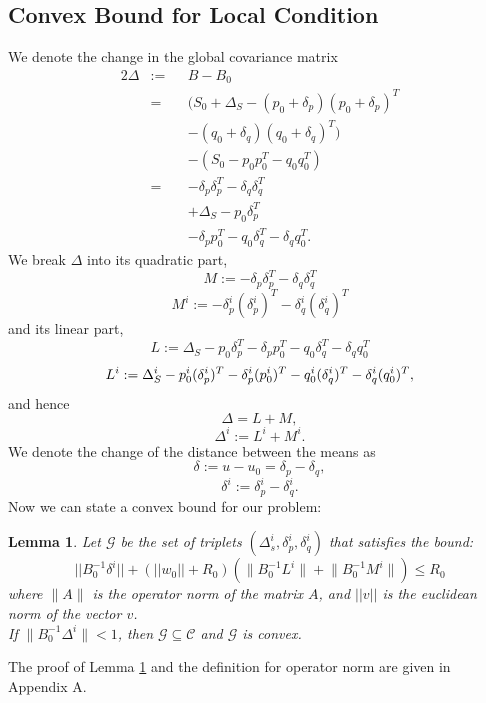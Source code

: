\documentclass{vldb}
\newtheorem{lemma}{Lemma}
\begin{document}
\subsection{Convex Bound for Local Condition}
We denote the change in the global covariance matrix
\begin{alignat*}{2}
\Delta & := && B-B_0 \\
& = && (S_0+\Delta_S - (p_0+\delta_p)(p_0+\delta_p)^T \\
& && - (q_0+\delta_q)(q_0+\delta_q)^T) \\
& && - (S_0 - p_0p_0^T - q_0q_0^T) \\
& = && - \delta_p\delta_p^T - \delta_q\delta_q^T \\
& && + \Delta_S - p_0\delta_p^T \\
& && - \delta_pp_0^T - q_0\delta_q^T - \delta_qq_0^T.
\end{alignat*}
We break $\Delta$ into its quadratic part,
\begin{equation*}
M:= - \delta_p\delta_p^T - \delta_q\delta_q^T
\end{equation*}
\begin{equation*}
M^i:= - \delta_p^i(\delta_p^i)^T - \delta_q^i(\delta_q^i)^T
\end{equation*}
and its linear part,
\begin{equation*}
L:= \Delta_S - p_0\delta_p^T - \delta_pp_0^T - q_0\delta_q^T - \delta_qq_0^T
\end{equation*}
\begin{equation*}
\\ L^i := \Delta_S^i - p_0^i(\delta_p^i)^T - \delta_p^i(p_0^i)^T -
q_0^i(\delta_q^i)^T - \delta_q^i(q_0^i)^T,
\end{equation*}
and hence
\begin{equation*}
\Delta= L+ M, 
\end{equation*}
\begin{equation*}
\Delta^i:= L^i+ M^i.
\end{equation*}
We denote the change of the distance between the means as
\begin{equation*}
\delta:= u-u_0 = \delta_p - \delta_q, 
\end{equation*}
\begin{equation*}
\delta^i:=\delta_p^i - \delta_q^i.
\end{equation*}
Now we can state a convex bound for our problem:
\begin{lemma} \label{convexBound}
Let $\mathcal{G}$ be the set of triplets $(\Delta_s^i, \delta_p^i, \delta_q^i)$
 that satisfies the bound:
 \begin{equation} \label{eq:convexBound}
||B_0^{-1}\delta^i|| + (||w_0||+R_0)(\Big \| B_0^{-1}L^i \Big \| + \Big \| B_0^{-1}M^i \Big \| ) \leq  R_0
\end{equation}
where $\Big \| A \Big \|$ is the operator norm of the matrix $A$, and $||v||$ is the euclidean norm of the vector $v$.
\\If $\Big \| B_0^{-1}\Delta^i \Big \| < 1$, then $\mathcal{G}\subseteq \mathcal{C}$ and $\mathcal{G}$ is convex.
\end{lemma}
The proof of Lemma \ref{convexBound} and the definition for operator norm are given in Appendix A.
\end{document}
